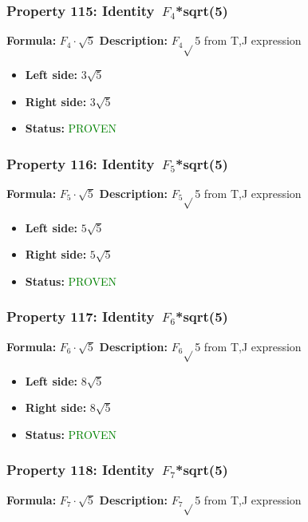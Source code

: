 \subsubsection*{Property 115: Identity~$F_{4}$*sqrt(5)}
\textbf{Formula:} $F_4 \cdot \sqrt{5}$
\textbf{Description:} $F_{4}$$\sqrt{}$5 from T,J expression

\begin{itemize}
\item \textbf{Left side:} $3 \sqrt{5}$
\item \textbf{Right side:} $3 \sqrt{5}$
\item \textbf{Status:} \textcolor{green}{PROVEN}
\end{itemize}

\subsubsection*{Property 116: Identity~$F_{5}$*sqrt(5)}
\textbf{Formula:} $F_5 \cdot \sqrt{5}$
\textbf{Description:} $F_{5}$$\sqrt{}$5 from T,J expression

\begin{itemize}
\item \textbf{Left side:} $5 \sqrt{5}$
\item \textbf{Right side:} $5 \sqrt{5}$
\item \textbf{Status:} \textcolor{green}{PROVEN}
\end{itemize}

\subsubsection*{Property 117: Identity~$F_{6}$*sqrt(5)}
\textbf{Formula:} $F_6 \cdot \sqrt{5}$
\textbf{Description:} $F_{6}$$\sqrt{}$5 from T,J expression

\begin{itemize}
\item \textbf{Left side:} $8 \sqrt{5}$
\item \textbf{Right side:} $8 \sqrt{5}$
\item \textbf{Status:} \textcolor{green}{PROVEN}
\end{itemize}

\subsubsection*{Property 118: Identity~$F_{7}$*sqrt(5)}
\textbf{Formula:} $F_7 \cdot \sqrt{5}$
\textbf{Description:} $F_{7}$$\sqrt{}$5 from T,J expression

